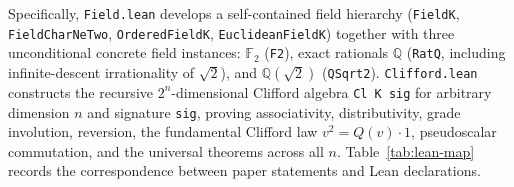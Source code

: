 \documentclass[11pt]{article}
\theoremstyle{definition}
\theoremstyle{remark}
\begin{document}
Specifically, \nolinkurl{Field.lean} develops a self-contained field hierarchy (\nolinkurl{FieldK}, \nolinkurl{FieldCharNeTwo}, \nolinkurl{OrderedFieldK}, \nolinkurl{EuclideanFieldK}) together with three unconditional concrete field instances: $\mathbb{F}_2$ (\nolinkurl{F2}), exact rationals $\mathbb{Q}$ (\nolinkurl{RatQ}, including infinite-descent irrationality of $\sqrt{2}$), and $\mathbb{Q}(\sqrt{2})$ (\nolinkurl{QSqrt2}). \nolinkurl{Clifford.lean} constructs the recursive $2^n$-dimensional Clifford algebra \texttt{Cl K sig} for arbitrary dimension $n$ and signature \texttt{sig}, proving associativity, distributivity, grade involution, reversion, the fundamental Clifford law $v^2 = Q(v) \cdot 1$, pseudoscalar commutation, and the universal theorems across all $n$. Table~\ref{tab:lean-map} records the correspondence between paper statements and Lean declarations.
\end{document}
